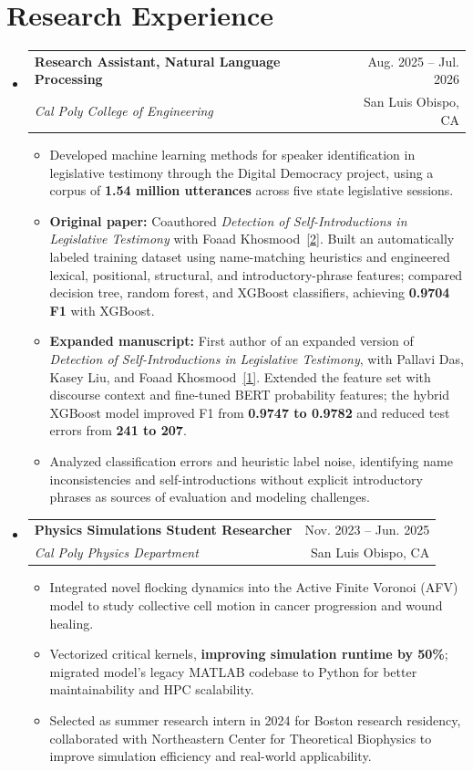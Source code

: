 \documentclass[letterpaper,11pt]{article}
\makeatletter
\newcommand{\resumeItem}[1]{\item\small{{#1 \vspace{-2pt}}}}
\newcommand{\resumeSubheading}[4]{
  \vspace{-2pt}\item
  \begin{tabular*}{0.97\textwidth}[t]{l@{\extracolsep{\fill}}r}
    \textbf{#1} & #2 \\
    \textit{\small #3} & {\small #4} \\
  \end{tabular*}\vspace{-7pt}
}
\newcommand{\resumeSubHeadingListStart}{\begin{itemize}[leftmargin=0.15in, label={}]}
\newcommand{\resumeSubHeadingListEnd}{\end{itemize}}
\newcommand{\resumeItemListStart}{\begin{itemize}[label={$\bullet$}]}
\newcommand{\resumeItemListEnd}{\end{itemize}\vspace{-5pt}}
\makeatother
\begin{document}
\section{Research Experience}
\resumeSubHeadingListStart
  \resumeSubheading
    {Research Assistant, Natural Language Processing}{Aug. 2025 -- Jul. 2026}
    {Cal Poly College of Engineering}{San Luis Obispo, CA}
    \resumeItemListStart
      \resumeItem{Developed machine learning methods for speaker identification in legislative testimony through the Digital Democracy project, using a corpus of \textbf{1.54 million utterances} across five state legislative sessions.}
      \resumeItem{\textbf{Original paper:} Coauthored \textit{Detection of Self-Introductions in Legislative Testimony} with Foaad Khosmood~\hyperlink{paper-cscsu}{[2]}. Built an automatically labeled training dataset using name-matching heuristics and engineered lexical, positional, structural, and introductory-phrase features; compared decision tree, random forest, and XGBoost classifiers, achieving \textbf{0.9704 F1} with XGBoost.}
      \resumeItem{\textbf{Expanded manuscript:} First author of an expanded version of \textit{Detection of Self-Introductions in Legislative Testimony}, with Pallavi Das, Kasey Liu, and Foaad Khosmood~\hyperlink{paper-vegas}{[1]}. Extended the feature set with discourse context and fine-tuned BERT probability features; the hybrid XGBoost model improved F1 from \textbf{0.9747 to 0.9782} and reduced test errors from \textbf{241 to 207}.}
      \resumeItem{Analyzed classification errors and heuristic label noise, identifying name inconsistencies and self-introductions without explicit introductory phrases as sources of evaluation and modeling challenges.}
    \resumeItemListEnd

  \resumeSubheading
    {Physics Simulations Student Researcher}{Nov. 2023 -- Jun. 2025}
    {Cal Poly Physics Department}{San Luis Obispo, CA}
    \resumeItemListStart
      \resumeItem{Integrated novel flocking dynamics into the Active Finite Voronoi (AFV) model to study collective cell motion in cancer progression and wound healing.}
      \resumeItem{Vectorized critical kernels, \textbf{improving simulation runtime by 50\%}; migrated model's legacy MATLAB codebase to Python for better maintainability and HPC scalability.}
      \resumeItem{Selected as summer research intern in 2024 for Boston research residency, collaborated with Northeastern Center for Theoretical Biophysics to improve simulation efficiency and real-world applicability.}
    \resumeItemListEnd
\resumeSubHeadingListEnd
\end{document}
